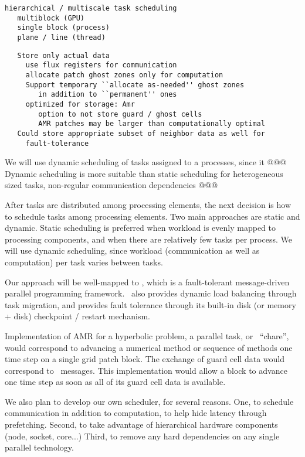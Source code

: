 \documentclass[10pt]{article}
\begin{document}
\begin{verbatim}
hierarchical / multiscale task scheduling
   multiblock (GPU)
   single block (process)
   plane / line (thread)
\end{verbatim}

\begin{verbatim}
   Store only actual data
     use flux registers for communication
     allocate patch ghost zones only for computation
     Support temporary ``allocate as-needed'' ghost zones
        in addition to ``permanent'' ones
     optimized for storage: Amr
        option to not store guard / ghost cells
        AMR patches may be larger than computationally optimal
   Could store appropriate subset of neighbor data as well for
     fault-tolerance
\end{verbatim}

We will use dynamic scheduling of tasks assigned to a processes, since
it @@@  Dynamic scheduling is more suitable than static scheduling for
heterogeneous sized tasks, non-regular communication dependencies @@@


After tasks are distributed among processing elements, the next
decision is how to schedule tasks among processing elements.  Two main
approaches are static and dynamic.  Static scheduling is preferred
when workload is evenly mapped to processing components, and when
there are relatively few tasks per process.  We will use dynamic
scheduling, since workload (communication as well as computation) per
task varies between tasks.

 Our approach will be well-mapped to \charm,
which is a fault-tolerant message-driven parallel programming
framework.  \charm\ also provides dynamic load balancing through task
migration, and provides fault tolerance through its built-in disk (or
memory + disk) checkpoint / restart mechanism.

Implementation of AMR for a hyperbolic problem, a parallel task, or
\charm\  ``chare'', would correspond to advancing a numerical method or
sequence of methods one time step on a single grid patch block.  The
exchange of guard cell data would correspond to \charm\  messages.
This implementation would allow a block to advance one time step as
soon as all of its guard cell data is available.


We also plan to develop our own scheduler, for several reasons.  One,
to schedule communication in addition to computation, to help hide
latency through prefetching.  Second, to take advantage of
hierarchical hardware components (node, socket, core...)  Third, to
remove any hard dependencies on any single parallel technology.
\end{document}
